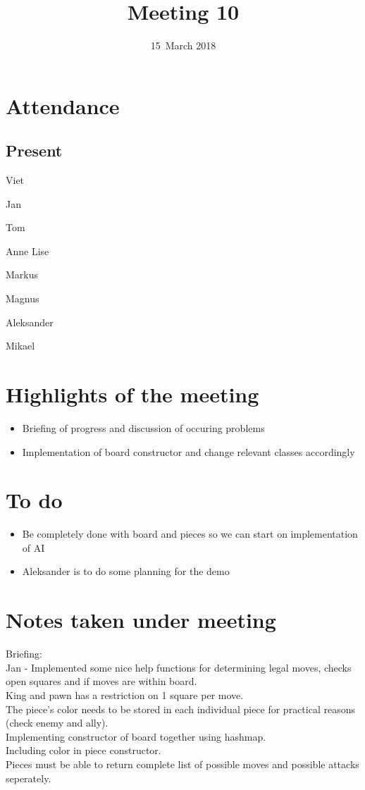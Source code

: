 \documentclass[letterpaper,11pt]{article}
\title{Meeting 10}
\date{15~March 2018}
\begin{document}
\maketitle
\section*{Attendance}
\subsection*{Present}
\begin{list}{}{}
	\item Viet
	\item Jan
	\item Tom
	\item Anne Lise
	\item Markus
	\item Magnus
	\item Aleksander
	\item Mikael
\end{list}

\newpage
\section*{Highlights of the meeting}
\begin{itemize}
	\item Briefing of progress and discussion of occuring problems
	\item Implementation of board constructor and change relevant classes accordingly
\end{itemize}

\section*{To do}
\begin{itemize}
	\item Be completely done with board and pieces so we can start on implementation of AI
	\item Aleksander is to do some planning for the demo
\end{itemize}

\section*{Notes taken under meeting}
Briefing: \\
Jan - Implemented some nice help functions for determining legal moves, checks open squares and if moves are within board. \\
King and pawn has a restriction on 1 square per move. \\
The piece's color needs to be stored in each individual piece for practical reasons (check enemy and ally). \\
Implementing constructor of board together using hashmap. \\
Including color in piece constructor. \\
Pieces must be able to return complete list of possible moves and possible attacks seperately. \\
\end{document}
